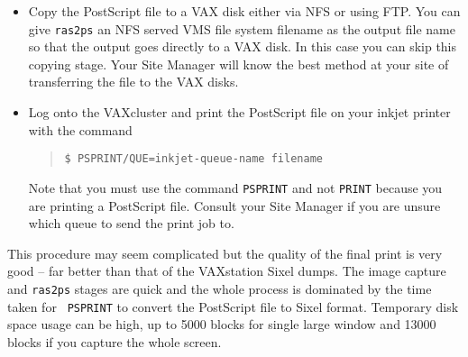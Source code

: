 \begin{itemize}
\item Copy the PostScript file to a VAX disk either via NFS  or using FTP. You
can give {\tt ras2ps} an NFS served VMS file system filename as the output file
name so that the output goes directly to a VAX disk. In this case you can skip
this copying stage. Your Site Manager will know the best method at your site 
of transferring the file to the VAX disks.
    
\item Log onto the VAXcluster and print the PostScript file on your inkjet
printer with the command

\begin{quote}
    
    {\tt \$ PSPRINT/QUE=inkjet-queue-name filename}
    
\end{quote}

Note that you must use the command {\tt PSPRINT} and not {\tt PRINT} because
you are printing a PostScript file. Consult your Site Manager if you are unsure 
which queue to send the print job to.


\end{itemize}

This procedure may seem complicated but the quality of the final print is very
good -- far better than that of the VAXstation Sixel dumps.
The image capture and {\tt ras2ps} stages 
are quick and the whole process is dominated by the time taken for {\tt
PSPRINT} to convert the PostScript file to Sixel format. Temporary disk space
usage can be high, up to 5000 blocks for single large window and 13000 blocks 
if you capture the whole screen. 
    

